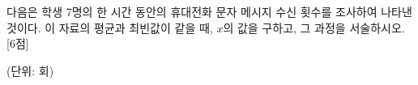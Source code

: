 다음은 학생 7명의 한 시간 동안의 휴대전화 문자 메시지 수신 횟수를 조사하여 나타낸 것이다. 이 자료의 평균과 최빈값이 같을 때, $x$의 값을 구하고, 그 과정을 서술하시오. \mbox{[6점]}\par\noindent\hfill{\footnotesize (단위: 회)}
